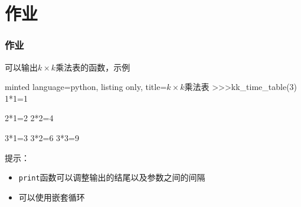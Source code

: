 \documentclass[10pt]{beamer}
\begin{document}
\section{作业}

\begin{frame}[fragile]
    \frametitle{作业} 

    可以输出$k\times k$乘法表的函数，示例

    \begin{tcblisting}{minted language=python, listing only, title=$k\times k$乘法表}
        >>>kk_time_table(3)
        1*1=1 
        
        2*1=2 2*2=4 
        
        3*1=3 3*2=6 3*3=9 \end{tcblisting}

    提示：
    \begin{itemize}
        \item \texttt{print}函数可以调整输出的结尾以及参数之间的间隔
        \item 可以使用嵌套循环
    \end{itemize}
    

\end{frame}
\end{document}
